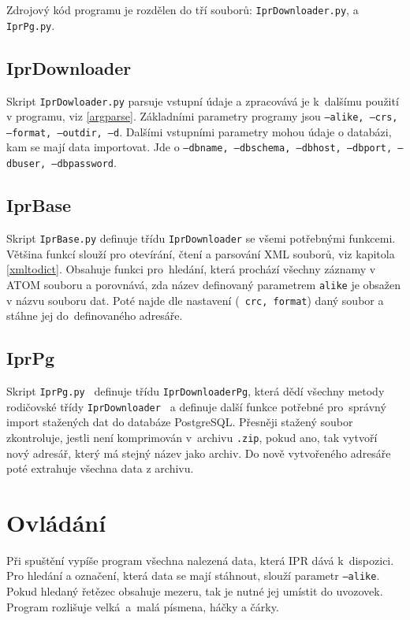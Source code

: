 Zdrojový kód programu je rozdělen do tří souborů: 
{\tt IprDownloader.py},  a {\tt IprPg.py}.


\subsection{IprDownloader}
Skript {\tt IprDowloader.py} parsuje vstupní údaje a
zpracovává je k~dalšímu použití v programu, viz \ref{argparse}. Základními parametry programy jsou
{\tt ---alike, ---crs, ---format, ---outdir, ---d}.
Dalšími vstupními parametry mohou údaje o databázi, kam se mají data
importovat. Jde o 
{\tt ---dbname, ---dbschema, ---dbhost, ---dbport, ---dbuser, ---dbpassword}.



\subsection{IprBase}
Skript {\tt IprBase.py} definuje třídu {\tt IprDownloader} se všemi
potřebnými funkcemi. Většina funkcí slouží pro otevírání, čtení a
parsování XML souborů, viz kapitola \ref{xmltodict}. Obsahuje funkci
pro~hledání, která prochází všechny záznamy v ATOM souboru a porovnává, zda název
definovaný parametrem {\tt alike} je obsažen v názvu souboru dat. Poté najde dle nastavení ({\tt
  crc, format}) daný soubor a stáhne jej do~definovaného adresáře.


\subsection{IprPg}
Skript {\tt IprPg.py } definuje třídu {\tt IprDownloaderPg}, která
dědí všechny metody rodičovské třídy {\tt IprDownloader } a definuje další
funkce potřebné pro~správný import stažených dat do databáze
PostgreSQL. Přesněji stažený soubor zkontroluje, jestli není 
komprimován v~archivu {\tt *.zip}, pokud ano, tak vytvoří nový adresář,
který má stejný název jako archiv. Do nově vytvořeného adresáře poté 
extrahuje všechna data z archivu.


\section{Ovládání}
Při spuštění vypíše program všechna nalezená data,
která IPR dává k~dispozici. Pro hledání a označení, která data se mají
stáhnout, slouží parametr {\tt ---alike}. Pokud hledaný řetězec obsahuje mezeru,
tak je nutné jej umístit do uvozovek. Program rozlišuje velká~a~malá
písmena, háčky a čárky.

